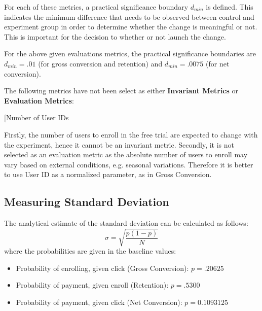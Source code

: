\documentclass[11pt]{article} %
\begin{document}
\noindent For each of these metrics, a practical significance boundary $d_{min}$ is defined. This indicates the minimum difference that needs to be observed between control and experiment group in order to determine whether the change is meaningful or not. This is important for the decision to whether or not launch the change.

For the above given evaluations metrics, the practical significance boundaries are $d_{min} = .01$ (for gross conversion and retention) and $d_{min} = .0075$ (for net conversion). \medskip

The following metrics have not been select as either \textbf{Invariant Metrics} or \textbf{Evaluation Metrics}:
\begin{labeling}{[Number of User IDs}
\item [Number of User IDs] Firstly, the number of users to enroll in the free trial are expected to change with the experiment, hence it cannot be an invariant metric. Secondly, it is not selected as an evaluation metric as the absolute number of users to enroll may vary based on external conditions, e.g. seasonal variations. Therefore it is better to use User ID as a normalized parameter, as in Gross Conversion.
\end{labeling}

\subsection{Measuring Standard Deviation}

The analytical estimate of the standard deviation can be calculated as follows:
\begin{equation}
     \sigma = \sqrt{\frac{p(1-p)}{N}}
\end{equation}
\noindent where the probabilities are given in the baseline values:
\begin{itemize}
\item Probability of enrolling, given click (Gross Conversion): $p= .20625$
\item Probability of payment, given enroll (Retention): $p=.5300$
\item Probability of payment, given click (Net Conversion): $p=0.1093125$
\end{itemize}
\end{document}
